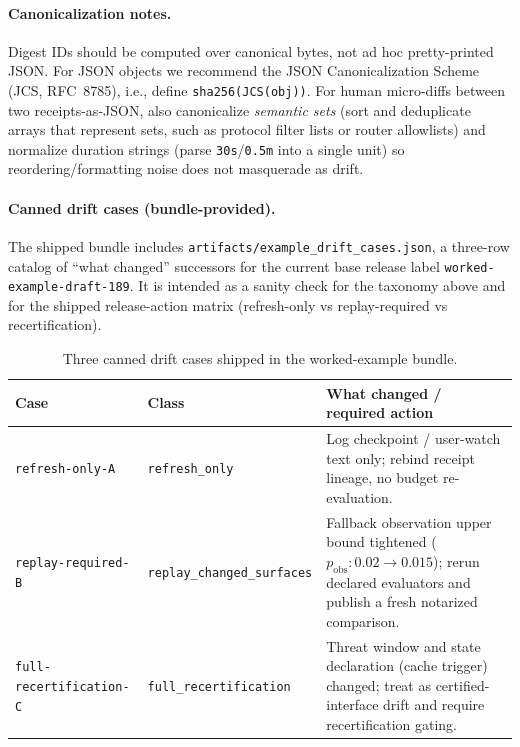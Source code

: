 \documentclass[11pt]{article}
\begin{document}
\paragraph{Canonicalization notes.}
Digest IDs should be computed over canonical bytes, not ad hoc pretty-printed JSON.
For JSON objects we recommend the JSON Canonicalization Scheme (JCS, RFC~8785), i.e., define \texttt{sha256(JCS(obj))}.\cite{rfc8785}
For human micro-diffs between two receipts-as-JSON, also canonicalize \emph{semantic sets} (sort and deduplicate arrays that represent sets, such as protocol filter lists or router allowlists) and normalize duration strings (parse \texttt{30s}/\texttt{0.5m} into a single unit) so reordering/formatting noise does not masquerade as drift.

\paragraph{Canned drift cases (bundle-provided).}
The shipped bundle includes \texttt{artifacts/example\_drift\_cases.json}, a three-row catalog of ``what changed'' successors for the current base release label \texttt{worked-example-draft-189}. It is intended as a sanity check for the taxonomy above and for the shipped release-action matrix (refresh-only vs replay-required vs recertification).
\begin{table}[t]
\centering
\begin{tabularx}{\linewidth}{@{}Y Y Y@{}}
\toprule
Case & Class & What changed / required action \\
\midrule
\texttt{refresh-only-A} & \texttt{refresh\_only} & Log checkpoint / user-watch text only; rebind receipt lineage, no budget re-evaluation. \\
\texttt{replay-required-B} & \texttt{replay\_changed\_surfaces} & Fallback observation upper bound tightened ($p_{\mathrm{obs}}:0.02\to0.015$); rerun declared evaluators and publish a fresh notarized comparison. \\
\texttt{full-recertification-C} & \texttt{full\_recertification} & Threat window and state declaration (cache trigger) changed; treat as certified-interface drift and require recertification gating. \\
\bottomrule
\end{tabularx}
\caption{Three canned drift cases shipped in the worked-example bundle.}\label{tab:workedexample-driftcases}
\end{table}
\end{document}
